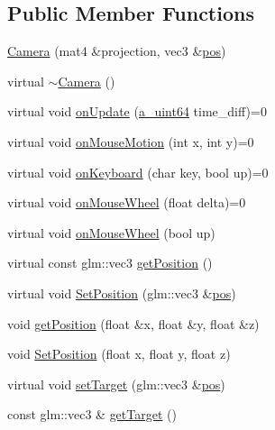 \subsection*{Public Member Functions}
\begin{DoxyCompactItemize}
\item 
\hyperlink{class_agmd_1_1_camera_a9f1bfd55d1d95a0ca43cf050ca8d88d6}{Camera} (mat4 \&projection, vec3 \&\hyperlink{_examples_2_planet_2_app_8cpp_aa8a1c0491559faca4ebd0881575ae7f0}{pos})
\item 
virtual \hyperlink{class_agmd_1_1_camera_ac8641a0fdc08e81ceb3e603ba82e4267}{$\sim$\+Camera} ()
\item 
virtual void \hyperlink{class_agmd_1_1_camera_af232107b328d1fa4c55ba98afa04a99b}{on\+Update} (\hyperlink{_common_defines_8h_a6c5192ec3c55d6e5b13d2dbaa082bdea}{a\+\_\+uint64} time\+\_\+diff)=0
\item 
virtual void \hyperlink{class_agmd_1_1_camera_a2a4fe292c83654aa7f2011f7f43c3635}{on\+Mouse\+Motion} (int x, int y)=0
\item 
virtual void \hyperlink{class_agmd_1_1_camera_a63fae187423be21161d39da11039e3ba}{on\+Keyboard} (char key, bool up)=0
\item 
virtual void \hyperlink{class_agmd_1_1_camera_aa372ea65985a59ede956ad731f5e06d1}{on\+Mouse\+Wheel} (float delta)=0
\item 
virtual void \hyperlink{class_agmd_1_1_camera_a7db9439e6553d5b72f2825a95a623d26}{on\+Mouse\+Wheel} (bool up)
\item 
virtual const glm\+::vec3 \hyperlink{class_agmd_1_1_camera_aabc09e5c46148902902121e2a82e5214}{get\+Position} ()
\item 
virtual void \hyperlink{class_agmd_1_1_camera_aaac6646a9bc85a2f8553324c5e6aa49c}{Set\+Position} (glm\+::vec3 \&\hyperlink{_examples_2_planet_2_app_8cpp_aa8a1c0491559faca4ebd0881575ae7f0}{pos})
\item 
void \hyperlink{class_agmd_1_1_camera_a9742ce12bd830fb1d1ef0c5e078e1bc4}{get\+Position} (float \&x, float \&y, float \&z)
\item 
void \hyperlink{class_agmd_1_1_camera_ad7d3edbb076b2505bb31327559829eea}{Set\+Position} (float x, float y, float z)
\item 
virtual void \hyperlink{class_agmd_1_1_camera_abdebfc669aef0af83bcda46fca1ee40f}{set\+Target} (glm\+::vec3 \&\hyperlink{_examples_2_planet_2_app_8cpp_aa8a1c0491559faca4ebd0881575ae7f0}{pos})
\item 
const glm\+::vec3 \& \hyperlink{class_agmd_1_1_camera_aa01989b7526bd556dbd63abb203247c7}{get\+Target} ()

\end{DoxyCompactItemize}
